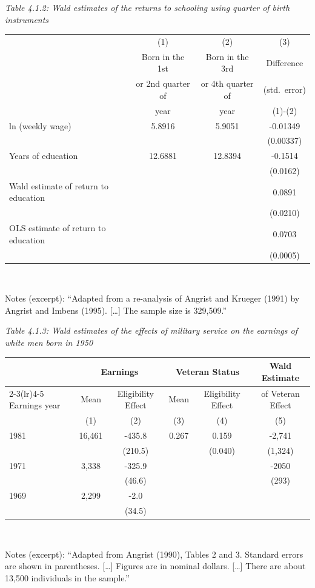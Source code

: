 \documentclass[11pt,a4paper]{article}
\begin{document}
\begin{center}
\medskip
\textit{Table 4.1.2: Wald estimates of the returns to schooling using quarter of birth instruments}\\[2pt]
\begin{tabular}{lccc}
\toprule
 & (1) & (2) & (3)\\
 & Born in the 1st & Born in the 3rd & Difference\\
 & or 2nd quarter of & or 4th quarter of & (std.\ error)\\
 & year & year & (1)-(2)\\
\midrule
ln (weekly wage) & 5.8916 & 5.9051 & -0.01349\\
 & & & (0.00337)\\
Years of education & 12.6881 & 12.8394 & -0.1514\\
 & & & (0.0162)\\
Wald estimate of return to education & & & 0.0891\\
 & & & (0.0210)\\
OLS estimate of return to education & & & 0.0703\\
 & & & (0.0005)\\
\bottomrule
\end{tabular}\\[2pt]
\parbox{0.92\linewidth}{\footnotesize Notes (excerpt): ``Adapted from a re-analysis of Angrist and Krueger (1991) by
Angrist and Imbens (1995). [\dots] The sample size is 329,509.''}

\medskip
\textit{Table 4.1.3: Wald estimates of the effects of military service on the earnings of white men born in 1950}\\[2pt]
\begin{tabular}{lccccc}
\toprule
 & \multicolumn{2}{c}{Earnings} & \multicolumn{2}{c}{Veteran Status} & Wald Estimate\\
\cmidrule(lr){2-3}\cmidrule(lr){4-5}
Earnings year & Mean & Eligibility Effect & Mean & Eligibility Effect & of Veteran Effect\\
 & (1) & (2) & (3) & (4) & (5)\\
\midrule
1981 & 16,461 & -435.8 & 0.267 & 0.159 & -2,741\\
 & & (210.5) & & (0.040) & (1,324)\\
1971 & 3,338 & -325.9 & & & -2050\\
 & & (46.6) & & & (293)\\
1969 & 2,299 & -2.0 & & & \\
 & & (34.5) & & & \\
\bottomrule
\end{tabular}\\[2pt]
\parbox{0.92\linewidth}{\footnotesize Notes (excerpt): ``Adapted from Angrist (1990), Tables 2 and 3. Standard errors are
shown in parentheses. [\dots] Figures are in nominal dollars. [\dots] There are about 13,500 individuals in the sample.''}
\end{center}
\end{document}
